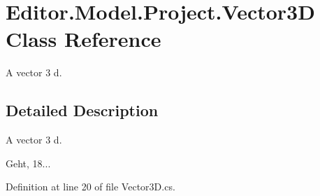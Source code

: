 \section{Editor.\-Model.\-Project.\-Vector3\-D Class Reference}
\label{class_editor_1_1_model_1_1_project_1_1_vector3_d}


A vector 3 d.  




\subsection{Detailed Description}
A vector 3 d. 

Geht, 18... 

Definition at line 20 of file Vector3\-D.\-cs.

